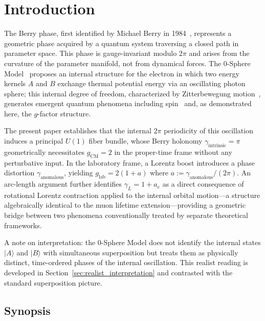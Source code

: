\documentclass[%
 reprint,
 amsmath,amssymb,
 aps,
 prb,
]{revtex4-2}
\numberwithin{equation}{section}
\theoremstyle{definition}
\theoremstyle{remark}
\newcommand{\Uone}{U(1)}
\begin{document}
\maketitle

\section{Introduction}
\label{sec:introduction}

The Berry phase, first identified by Michael Berry in 1984~\cite{Berry1984}, represents a geometric phase acquired by a quantum system traversing a closed path in parameter space. This phase is gauge-invariant modulo $2\pi$ and arises from the curvature of the parameter manifold, not from dynamical forces. The 0-Sphere Model~\cite{Hanamura_2018_01,Hanamura_2025_24} proposes an internal structure for the electron in which two energy kernels $A$ and $B$ exchange thermal potential energy via an oscillating photon sphere; this internal degree of freedom, characterized by Zitterbewegung motion~\cite{Schrodinger1930,Dirac1928}, generates emergent quantum phenomena including spin~\cite{Hanamura_2025_26} and, as demonstrated here, the $g$-factor structure.

The present paper establishes that the internal $2\pi$ periodicity of this oscillation induces a principal $\Uone$ fiber bundle, whose Berry holonomy $\gamma_{\text{intrinsic}} = \pi$ geometrically necessitates $g_{\text{CM}} = 2$ in the proper-time frame without any perturbative input. In the laboratory frame, a Lorentz boost introduces a phase distortion $\gamma_{\text{anomalous}}$, yielding $g_{\text{lab}} = 2(1+a)$ where $a := \gamma_{\text{anomalous}}/(2\pi)$. An arc-length argument further identifies $\gamma_L = 1 + a_e$ as a direct consequence of rotational Lorentz contraction applied to the internal orbital motion---a structure algebraically identical to the muon lifetime extension---providing a geometric bridge between two phenomena conventionally treated by separate theoretical frameworks.

A note on interpretation: the 0-Sphere Model does not identify the internal states $|A\rangle$ and $|B\rangle$ with simultaneous superposition but treats them as physically distinct, time-ordered phases of the internal oscillation. This realist reading is developed in Section~\ref{sec:realist_interpretation} and contrasted with the standard superposition picture.

\subsection*{Synopsis}
\end{document}
